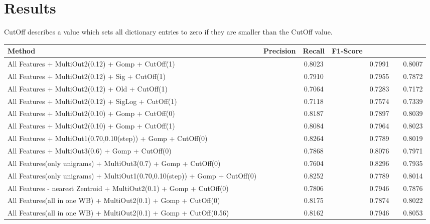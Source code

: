 \documentclass{article}
\begin{document}
\section{Results}

CutOff describes a value which sets all dictionary entries to zero if they are smaller than the CutOff value.\\

\begin{tabular}{ | l | c | c | c |}
	\hline
	Method & Precision & Recall & F1-Score\\
	\hline
	\hline
	All Features + MultiOut2(0.12) + Gomp + CutOff(1) && 0.8023 && 0.7991 && 0.8007\\
	\hline
	All Features + MultiOut2(0.12) + Sig + CutOff(1) && 0.7910 && 0.7955 && 0.7872\\
	\hline
	All Features + MultiOut2(0.12) + Old + CutOff(1) && 0.7064 && 0.7283 && 0.7172\\
	\hline
	All Features + MultiOut2(0.12) + SigLog + CutOff(1) && 0.7118 && 0.7574 && 0.7339\\
	\hline
	All Features + MultiOut2(0.10) + Gomp + CutOff(0) && 0.8187 && 0.7897 && 0.8039\\
	\hline
	All Features + MultiOut2(0.10) + Gomp + CutOff(1) && 0.8084 && 0.7964 && 0.8023\\
	\hline
	All Features + MultiOut1(0.70,0.10(step)) + Gomp + CutOff(0) && 0.8264 && 0.7789 && 0.8019\\
	\hline
	All Features + MultiOut3(0.6) + Gomp + CutOff(0) && 0.7868 && 0.8076 && 0.7971\\
	\hline
	All Features(only unigrams) + MultiOut3(0.7) + Gomp + CutOff(0) && 0.7604 && 0.8296 && 0.7935\\
	\hline
	All Features(only unigrams) + MultiOut1(0.70,0.10(step)) + Gomp + CutOff(0) && 0.8252 && 0.7789 && 0.8014\\
	\hline
	All Features - nearest Zentroid + MultiOut2(0.1) + Gomp + CutOff(0) && 0.7806 && 0.7946 && 0.7876\\
	\hline
	All Features(all in one WB) + MultiOut2(0.1) + Gomp + CutOff(0) && 0.8175 && 0.7874 && 0.8022\\
	\hline
	All Features(all in one WB) + MultiOut2(0.1) + Gomp + CutOff(0.56) && 0.8162 && 0.7946 && 0.8053\\
\end{tabular}
\end{document}
